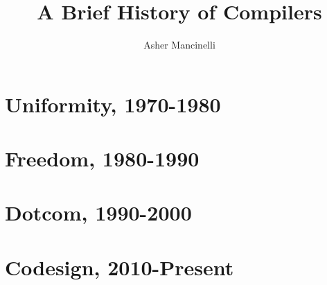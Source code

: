 \documentclass[12pt,openany]{book}
\title{A Brief History of Compilers}
\author{Asher Mancinelli}
\date{}
\begin{document}

\maketitle


\tableofcontents








\chapter{Uniformity, 1970-1980}
\chapter{Freedom, 1980-1990}
\chapter{Dotcom, 1990-2000}
\chapter{Codesign, 2010-Present}



\nocite{*}
\printbibliography[heading=bibintoc]
\end{document}
